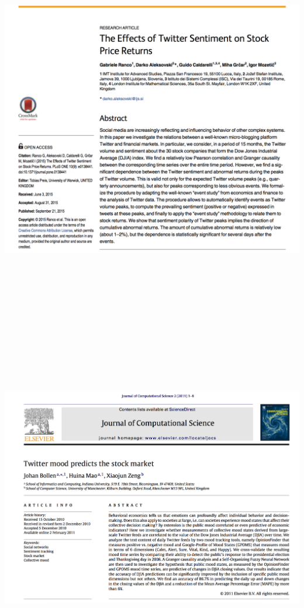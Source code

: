 \includegraphics[width=7.81250in,height=6.45833in]{twitter1.png}

\includegraphics[width=7.81250in,height=6.25000in]{twitter.png}

